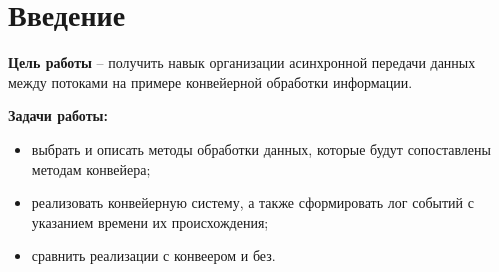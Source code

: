 \chapter*{Введение}
\textbf{Цель работы} – получить навык организации асинхронной передачи данных между потоками на примере конвейерной обработки информации.

\textbf{Задачи работы:}
\begin{itemize}
	\item выбрать и описать методы обработки данных, которые будут сопоставлены методам конвейера;
	\item реализовать конвейерную систему, а также сформировать лог событий с указанием времени их происхождения;
	\item сравнить реализации с конвеером и без.
\end{itemize}